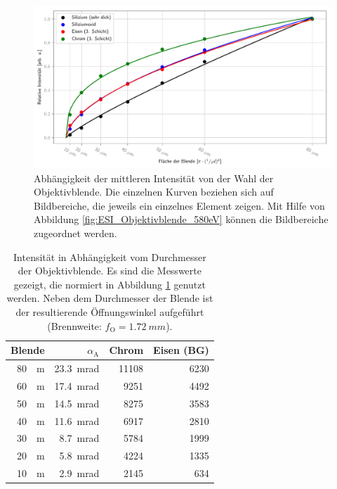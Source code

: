 \documentclass[
	paper=a4,				%
	twoside=true,			%
	BCOR=6mm,				%
	fontsize=12pt,			%
	pagesize=auto,			%
	numbers=noenddot,		%
	bibliography=totoc,		%
	draft=false
]{scrartcl}
\begin{document}
\begin{figure}
	\centering
	\includegraphics[width=1\linewidth]{../Jupyter-Notebooks/AnhangC/Bilder/ESI_Objektivblende}
	\caption{Abhängigkeit der mittleren Intensität von der Wahl der Objektivblende. Die einzelnen Kurven beziehen sich auf Bildbereiche, die jeweils ein einzelnes Element zeigen. Mit Hilfe von Abbildung \ref{fig:ESI_Objektivblende_580eV} können die Bildbereiche zugeordnet werden.}
	\label{fig:ESI_Objektivblende}
\end{figure}

\begin{table}
	\centering
	\caption{Intensität in Abhängigkeit vom Durchmesser der Objektivblende. Es sind die Messwerte gezeigt, die normiert in Abbildung \ref{fig:ESI_Objektivblende} genutzt werden. Neben dem Durchmesser der Blende ist der resultierende Öffnungswinkel aufgeführt (Brennweite: $f_\mathrm{O}=\SI{1,72}{mm}$).}
	\begin{tabular}{|r|r|r|r|}
		\hline 
		Blende & $\alpha_\mathrm{A}$ & Chrom & Eisen (BG) \\ 
		\hline 
		\SI{80}{\mu\meter} & \SI{23,3}{mrad} & 11108 & 6230 \\ 
		\hline 
		\SI{60}{\mu\meter} & \SI{17,4}{mrad} & 9251 & 4492 \\ 
		\hline 
		\SI{50}{\mu\meter} & \SI{14,5}{mrad} & 8275 & 3583 \\ 
		\hline 
		\SI{40}{\mu\meter} & \SI{11,6}{mrad} & 6917 & 2810 \\ 
		\hline 
		\SI{30}{\mu\meter} & \SI{8,7}{mrad} & 5784 & 1999 \\ 
		\hline 
		\SI{20}{\mu\meter} & \SI{5,8}{mrad} & 4224 & 1335 \\ 
		\hline 
		\SI{10}{\mu\meter} & \SI{2,9}{mrad} & 2145 & 634 \\ 
		\hline 
	\end{tabular} 
	\label{tab:ESI_Objektivblende}
\end{table}
\end{document}
